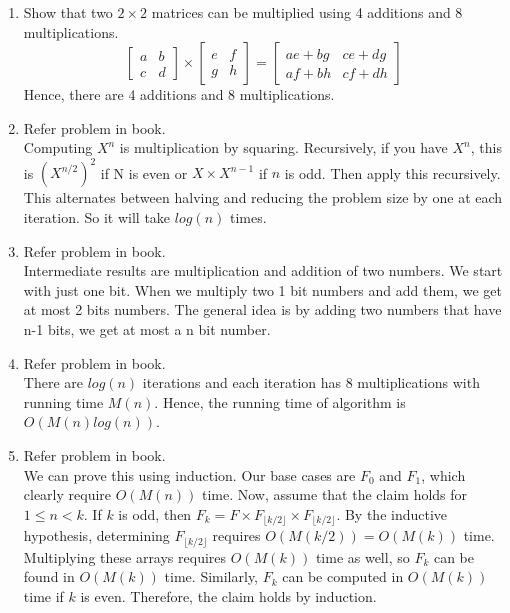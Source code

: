 \documentclass[11pt]{article}
\begin{document}
	\begin{enumerate}[label=(\alph*)]
		\item Show that two $2\times 2$ matrices can be multiplied using 4 additions and 8 multiplications.\\		
		$$\begin{bmatrix}
			a & b\\c & d
		\end{bmatrix} \times
		\begin{bmatrix}
		e & f\\g & h
		\end{bmatrix} = 
		\begin{bmatrix}
			ae+bg & ce+dg\\af+bh & cf+dh
		\end{bmatrix}$$
		Hence, there are 4 additions and 8 multiplications.
		
		\item Refer problem in book.\\
		Computing $X^n$ is multiplication by squaring. Recursively, if you have $X^n$, this is $(X^{n/2})^2$ if N is even or $X\times X^{n-1}$ if $n$ is odd. Then apply this recursively. This alternates between halving and reducing the problem size by one at each iteration. So it will take $log(n)$ times. 
		
		\item Refer problem in book.\\
		Intermediate results are multiplication and addition of two numbers. We start with just one bit. When we multiply two 1 bit numbers and add them, we get at most 2 bits numbers. The general idea is by adding two numbers that have n-1 
		bits, we get at most a n bit number.
		
		\item Refer problem in book.\\
		There are $log(n)$ iterations and each iteration has 8 multiplications with running time $M(n)$. Hence, the running time of algorithm is $O(M(n)log(n))$.
		
		\item Refer problem in book.\\
		We can prove this using induction. Our base cases are $F_0$ and $F_1$, which clearly require $O(M(n))$ time. Now, assume that the claim holds for $1 \leq n < k$. If $k$ is odd, then $F_k = F\times F_{\lfloor k/2 \rfloor}\times F_{\lfloor k/2 \rfloor}$. By the inductive hypothesis, determining $F_{\lfloor k/2 \rfloor}$ requires $O(M(k/2)) = O(M(k))$ time. Multiplying these arrays requires $O(M(k))$ time as well, so $F_k$ can be found in $O(M(k))$ time. Similarly, $F_k$ can be computed in $O(M(k))$ time if $k$ is even. Therefore, the claim holds by induction. 
	\end{enumerate}
\end{document}
